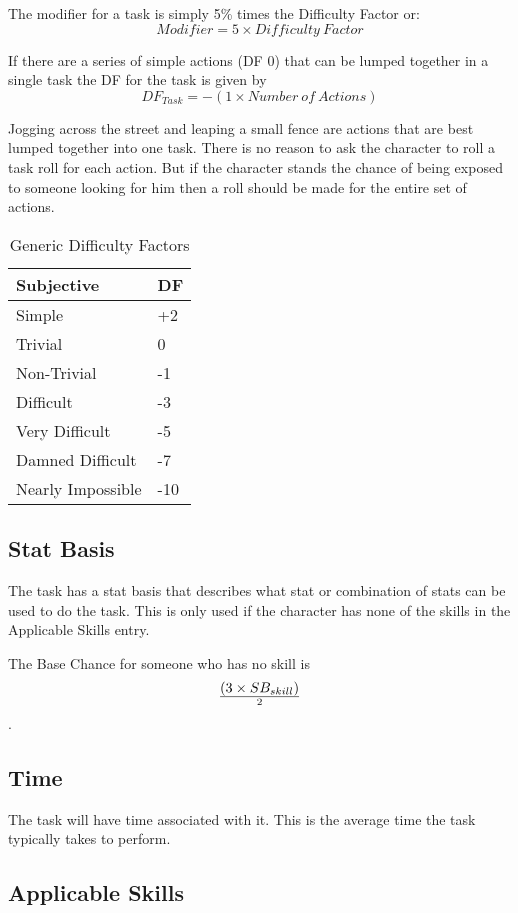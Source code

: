 The modifier for a task is simply 5\% times the Difficulty Factor or:
\[ Modifier = 5 \times {Difficulty\ Factor} \]

If there are a series of simple actions (DF 0) that can be lumped 
together in a single task the DF for the task is given by \[ DF_{Task} =  - ( 1
\times {Number\ of\ Actions }) \]  

Jogging across the street and leaping a small fence are actions that 
are best lumped together into one task. There is no reason 
to ask the character to roll a task roll for each action. 
But if the character stands the chance of being exposed to
someone looking for him then a roll should be made for the entire set 
of actions. 

\begin{table}[h]
	\begin{tabular}{l|l}
	Subjective						& DF \\
	\hline
    Simple			& +2 \\
	Trivial			&  0 \\
	Non-Trivial	 	&  -1 \\
	Difficult		&  -3 \\
	Very Difficult  & -5 \\ 
	Damned Difficult & -7 \\
   	Nearly Impossible & -10 \\
	\end{tabular}
    \caption{Generic Difficulty Factors}
\end{table}

\subsection{Stat Basis}

The task has a stat basis that describes what stat or combination of 
stats can be used to do the task. This is only used if the character 
has none of the skills in the Applicable Skills entry. 

The Base Chance for someone who has no skill is 
\[ (3 \times SB_{skill}) \over {2} \]. 

\subsection{Time}

The task will have time associated with it. This is the average time 
the task typically takes to perform. 

\subsection{Applicable Skills}

